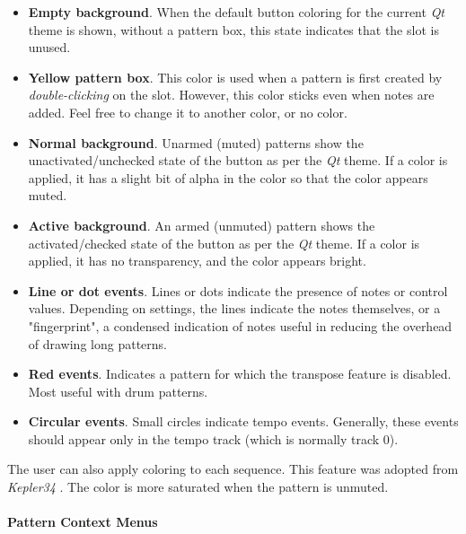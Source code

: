    \begin{itemize}
      \item \textbf{Empty background}.
         When the default button coloring for
         the current \textsl{Qt} theme is shown, without a pattern box,
         this state indicates that the slot is unused.
      \item \textbf{Yellow pattern box}.
         This color is used when a pattern is
         first created by \textsl{double-clicking} on the slot.
         However, this color sticks even when notes are added.
         Feel free to change it to another color, or no color.
      \item \textbf{Normal background}.
         Unarmed (muted) patterns show the
         unactivated/unchecked state of the button as per the \textsl{Qt}
         theme.  If a color is applied, it has a slight bit of alpha in the
         color so that the color appears muted.
      \item \textbf{Active background}.
         An armed (unmuted) pattern shows the
         activated/checked state of the button as per the \textsl{Qt}
         theme.  If a color is applied, it has no transparency, and the 
         color appears bright.
      \item \textbf{Line or dot events}.
         Lines or dots indicate the presence of notes or control
         values.  Depending on settings, the
         lines indicate the notes themselves, or a "fingerprint", a condensed
         indication of notes useful in reducing the overhead of
         drawing long patterns.
      \item \textbf{Red events}.
         Indicates a pattern for which the transpose feature is
         disabled.  Most useful with drum patterns.
      \item \textbf{Circular events}.
         Small circles indicate tempo events.  Generally, these events should
         appear only in the tempo track (which is normally track 0).
   \end{itemize}

   The user can also apply coloring to each sequence.
   This feature was adopted from \textsl{Kepler34} \cite{kepler34}.
   The color is more saturated when the pattern is unmuted.

\paragraph{Pattern Context Menus}
\label{paragraph:patterns_context_menus}

